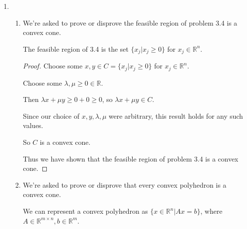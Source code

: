 \documentclass[12pt,letterpaper]{article}
\begin{document}
\begin{enumerate}
\begin{proof}
        If we choose an arbitrary $a_{kl} \leq 0$ and its corresponding $x_l$,
        then we can increase $x_l$ while still keeping the constraint valid.

        If increasing $x_l$ causes some other constraint to be invalidated--%
        say $\sum\limits_{j = 1}^n a_{pj}x_j \leq 0$--%
        then we simply increase the $x_q$ corresponding to the $a_{pq}$ that is less than or equal to 0.
        Repeating this process as necessary.

        What we find is that, increasing any arbitrary $x_l$ does not invalidate any constraints.
        However, the objective value becomes larger.
        Since we can increase any arbitrary $x_l$ to any amount,
        this problem is unbounded.

        Thus, (with some mental reformulation) we have shown that:

        Given a linear program with all right hand sides equal to 0,
        either $x_j = 0$ is optimal for all $j$, or the problem is unbounded.
      \end{proof}
    \item
      \begin{enumerate}
        \item
          We're asked to prove or disprove the feasible region of problem 3.4 is a convex cone.

          The feasible region of 3.4 is the set $\{x_j | x_j \geq 0\}$ for $x_j \in \mathbb{R}^n$.

          \begin{proof}
            Choose some $x, y \in C = \{x_j | x_j \geq 0\}$ for $x_j \in \mathbb{R}^n$.

            Choose some $\lambda, \mu \geq 0 \in \mathbb{R}$.

            Then $\lambda x + \mu y \geq 0 + 0 \geq 0$, so $\lambda x + \mu y \in C$.

            Since our choice of $x, y, \lambda, \mu$ were arbitrary,
            this result holds for any such values.

            So $C$ is a convex cone.

            Thus we have shown that the feasible region of problem 3.4 is a convex cone.
          \end{proof}
        \item
          We're asked to prove or disprove that every convex polyhedron is a convex cone.

          We can represent a convex polyhedron as $\{x \in \mathbb{R}^n | Ax = b\}$,
          where $A \in \mathbb{R}^{m \times n}, b \in \mathbb{R}^m$.


\end{enumerate}
\end{enumerate}
\end{document}

